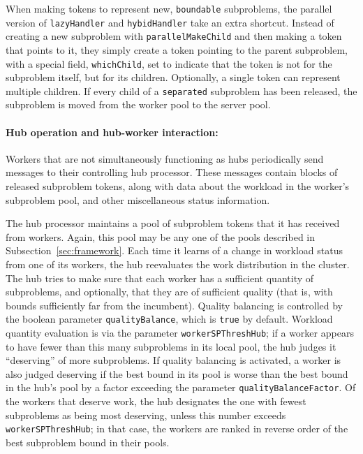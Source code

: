 When making tokens to represent new, \texttt{boundable} subproblems,
the parallel version of \texttt{lazyHandler} and \texttt{hybidHandler}
take an extra shortcut.  Instead of creating a new subproblem with
\texttt{parallelMakeChild} and then making a token that points to it,
they simply create a token pointing to the parent subproblem, with a
special field, \texttt{whichChild}, set to indicate that the token is
not for the subproblem itself, but for its children.  Optionally, a
single token can represent multiple children.  If every child of a
\texttt{separated} subproblem has been released, the subproblem is
moved from the worker pool to the server pool.

\paragraph{Hub operation and hub-worker interaction:}
Workers that are not simultaneously functioning as hubs periodically
send messages to their controlling hub processor.  These messages
contain blocks of released subproblem tokens, along with data about
the workload in the worker's subproblem pool, and other miscellaneous
status information.

The hub processor maintains a pool of subproblem tokens that it has
received from workers.  Again, this pool may be any one of the pools
described in Subsection~\ref{sec:framework}.  Each time it learns of a
change in workload status from one of its workers, the hub reevaluates
the work distribution in the cluster.  The hub tries to make sure that
each worker has a sufficient quantity of subproblems, and optionally,
that they are of sufficient quality (that is, with bounds sufficiently
far from the incumbent).  Quality balancing is controlled by the
boolean parameter \texttt{qualityBalance}, which is \texttt{true} by
default.  Workload quantity evaluation is via the parameter
\texttt{workerSPThreshHub}; if a worker appears to have fewer than
this many subproblems in its local pool, the hub judges it
``deserving'' of more subproblems.  If quality balancing is activated,
a worker is also judged deserving if the best bound in its pool is
worse than the best bound in the hub's pool by a factor exceeding the
parameter \texttt{qualityBalanceFactor}.  Of the workers that deserve
work, the hub designates the one with fewest subproblems as being most
deserving, unless this number exceeds \texttt{workerSPThreshHub}; in
that case, the workers are ranked in reverse order of the best
subproblem bound in their pools.

